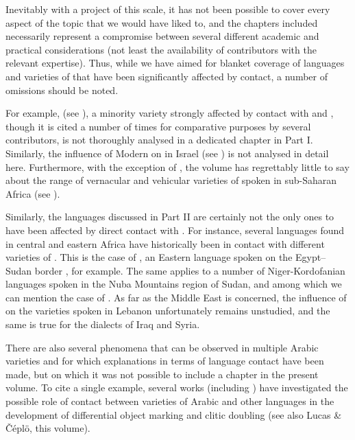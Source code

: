 \documentclass[output=paper]{langsci/langscibook}
\begin{document}
Inevitably with a project of this scale, it has not been possible to cover every  aspect of the topic that we would have liked to, and the chapters included necessarily represent a compromise between several different academic and practical considerations (not least the availability of contributors with the relevant expertise). Thus, while we have aimed for blanket coverage of languages and varieties of  that have been significantly affected by contact, a number of omissions should be noted.

For example,   (see \citealt{Seeger2013article}), a minority variety strong\-ly affected by contact with  and , though it is cited a number of times for {comparative} purposes by several contributors, is not thoroughly analysed in a dedicated chapter in Part I. Similarly, the influence of Modern  on   in Israel (see \citealt{Horesh2015}) is not analysed in detail here. Furthermore, with the exception of  , the volume has regrettably little to say about the range of vernacular and vehicular varieties of  spoken in sub-Saharan Africa (see \citealt{Lafkioui2013book}).

 Similarly, the languages discussed in Part II are certainly not the only ones to have been affected by direct contact with . For instance, several  languages found in central and eastern Africa have historically been in contact with different varieties of . This is the case of , an Eastern  language spoken on the Egypt--Sudan border \citep{Rouchdy1980}, for example. The same applies to a number of Niger-Kordofanian languages spoken in the Nuba Mountains region of Sudan, and among which we can mention the case of  \citep{Quint2018}. As far as the Middle East is concerned, the influence of  on the  varieties spoken in Lebanon unfortunately remains unstudied, and the same is true for the  dialects of Iraq and Syria. 
 
 There are also several phenomena that can be observed in multiple Arabic varieties and for which explanations in terms of language contact have been made, but on which it was not possible to include a chapter in the present volume. To cite a single example, several works (including \citealt{Coghill2014,dohla2016,Souag2017clitic}) have investigated the possible role of contact between varieties of Arabic and other languages in the development of differential object marking and clitic doubling (see also Lucas \& Čéplö,  this volume).
\end{document}
